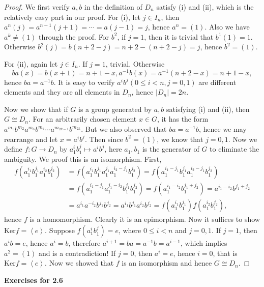 \begin{proof}
We first verify $a,b$ in the definition of $D_n$ satisfy (i) and (ii), which is the relatively easy part in our proof. For (i), let $j\in I_n$, then $a^n(j)=a^{n-1}(j+1)=\cdots=a(j-1)=j$, hence $a^n=(1)$. Also we have $a^k\ne(1)$ through the proof. For $b^2$, if $j=1$, then it is trivial that $b^1(1)=1$. Otherwise $b^2(j)=b(n+2-j)=n+2-(n+2-j)=j$, hence $b^2=(1)$.\par
For (ii), again let $j\in I_n$. If $j=1$, trivial. Otherwise 
$$
ba\left( x \right) =b\left( x+1 \right) =n+1-x,a^{-1}b\left( x \right) =a^{-1}\left( n+2-x \right) =n+1-x,
$$
hence $ba=a^{-1}b$. It is easy to verify $a^ib^j(0\le i<n,j=0,1)$ are different elements and they are all elements in $D_n$, hence $|D_n|=2n$.
\par
Now we show that if $G$ is a group generated by $a,b$ satisfying (i) and (ii), then $G\cong D_n$. For an arbitrarily chosen element $x\in G$, it has the form $a^{m_1}b^{m_2}a^{m_3}b^{m_4}\cdots a^{m_{2k-1}}b^{m_{2k}}$. But we also observed that $ba=a^{-1}b$, hence we may rearrange and let $x=a^ib^j$. Then since $b^2=(1)$, we know that $j=0,1$. Now we define $f:G\to D_n$ by $a_1^ib_1^j\mapsto a^ib^j$, here $a_1,b_1$ is the generator of $G$ to eliminate the ambiguity. We proof this is an isomorphism. First, 
$$
\begin{aligned}
f\left( a_{1}^{i_1}b_{1}^{j_1}a_{1}^{i_2}b_{1}^{j_2} \right) 
&=f\left( a_{1}^{i_1}b_{1}^{j_1}a_{1}^{j_1}a_{1}^{i_2-j_1}b_{1}^{j_2} \right) =f\left( a_{1}^{i_1-j_1}b_{1}^{j_1}a_{1}^{i_2-j_1}b_{1}^{j_2} \right) 
\\
&=f\left( a_{1}^{i_1-j_1}a_{1}^{j_1-i_2}b_{1}^{j_1}b_{1}^{j_2} \right) =f\left( a_{1}^{i_1-i_2}b_{1}^{j_1+j_2} \right) =a^{i_1-i_2}b^{j_1+j_2}
\\
&=a^{i_1}a^{-i_2}b^{j_1}b^{j_2}=a^{i_1}b^{j_1}a^{i_2}b^{j_2}=f\left( a_{1}^{i_1}b_{1}^{j_1} \right) f\left( a_{1}^{i_2}b_{1}^{j_2} \right) ,
\end{aligned}
$$
hence $f$ is a homomorphism. Clearly it is an epimorphism. Now it suffices to show $\mathrm{Ker}f=\left<e\right>$. Suppose $f(a_1^ib_1^j)=e$, where $0\le i<n$ and $j=0,1$. If $j=1$, then $a^ib=e$, hence $a^i=b$, therefore $a^{i+1}=ba=a^{-1}b=a^{i-1}$, which implies $a^2=(1)$ and is a contradiction! If $j=0$, then $a^i=e$, hence $i=0$, that is $\mathrm{Ker}f=\left<e\right>$. Now we showed that $f$ is an isomorphism and hence $G\cong D_n$.
\end{proof}
\begin{center}
\begin{large}
    \textbf{Exercises for 2.6}
\end{large}
\end{center}
